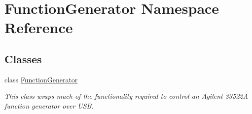 \hypertarget{namespace_function_generator}{}\section{Function\+Generator Namespace Reference}
\label{namespace_function_generator}
\subsection*{Classes}
\begin{DoxyCompactItemize}
\item 
class \hyperlink{class_function_generator_1_1_function_generator}{Function\+Generator}
\begin{DoxyCompactList}\small\item\em This class wraps much of the functionality required to control an Agilent 33522\+A function generator over U\+S\+B. \end{DoxyCompactList}\end{DoxyCompactItemize}
